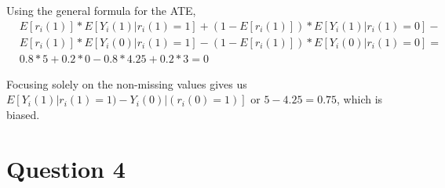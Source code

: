 \documentclass[11pt,notitlepage]{article}\usepackage[]{graphicx}\usepackage[]{color}
\makeatletter
\newenvironment{kframe}{%
 \def\at@end@of@kframe{}%
 \ifinner\ifhmode%
  \def\at@end@of@kframe{\end{minipage}}%
  \begin{minipage}{\columnwidth}%
 \fi\fi%
 \def\FrameCommand##1{\hskip\@totalleftmargin \hskip-\fboxsep
 \colorbox{shadecolor}{##1}\hskip-\fboxsep
     \hskip-\linewidth \hskip-\@totalleftmargin \hskip\columnwidth}%
 \MakeFramed {\advance\hsize-\width
   \@totalleftmargin\z@ \linewidth\hsize
   \@setminipage}}%
 {\par\unskip\endMakeFramed%
 \at@end@of@kframe}
\newenvironment{knitrout}{}{} %
\makeatother
\begin{document}
Using the general formula for the ATE,
\begin{align*}
& E[r_i(1)] * E[Y_i(1)|r_i(1)=1] + (1-E[r_i(1)])*E[Y_i(1)|r_i(1)=0] - \\
& E[r_i(1)] * E[Y_i(0)|r_i(1)=1]-(1-E[r_i(1)])*E[Y_i(0)|r_i(1)=0] =\\
& 0.8 * 5 + 0.2 * 0 - 0.8*4.25 + 0.2*3 = 0
\end{align*}

Focusing solely on the non-missing values gives us $E[Y_i(1)|r_i(1)=1)-Y_i(0)|(r_i (0)=1)]$ or $5 - 4.25 = 0.75$, which is biased.

\section*{Question 4}
\begin{knitrout}
\color{fgcolor}\begin{kframe}
\begin{verbatim}






\end{verbatim}
\end{kframe}
\end{knitrout}
\end{document}
